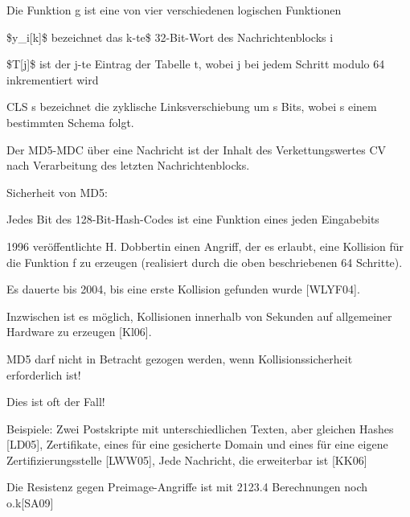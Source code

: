 \documentclass[a4paper]{article}
\begin{document}
\begin{multicols}{3}
\begin{itemize*}
            \begin{itemize*}
                  \item Die Funktion g ist eine von vier verschiedenen logischen Funktionen
                  \item \$y\_i{[}k{]}\$ bezeichnet das k-te\$ 32-Bit-Wort des Nachrichtenblocks i
                  \item \$T{[}j{]}\$ ist der j-te Eintrag der Tabelle t, wobei j bei jedem Schritt modulo 64 inkrementiert wird
                  \item CLS s bezeichnet die zyklische Linksverschiebung um s Bits, wobei s einem bestimmten Schema folgt.
            \end{itemize*}
            \item
            Der MD5-MDC über eine Nachricht ist der Inhalt des Verkettungswertes
            CV nach Verarbeitung des letzten Nachrichtenblocks.
            \item
            Sicherheit von MD5:

            \begin{itemize*}
                  \item Jedes Bit des 128-Bit-Hash-Codes ist eine Funktion eines jeden Eingabebits
                  \item 1996 veröffentlichte H. Dobbertin einen Angriff, der es erlaubt, eine Kollision für die Funktion f zu erzeugen (realisiert durch die oben beschriebenen 64 Schritte).
                  \item Es dauerte bis 2004, bis eine erste Kollision gefunden wurde {[}WLYF04{]}.
                  \item Inzwischen ist es möglich, Kollisionen innerhalb von Sekunden auf allgemeiner Hardware zu erzeugen {[}Kl06{]}.
                  \item MD5 darf nicht in Betracht gezogen werden, wenn Kollisionssicherheit erforderlich ist!
                  \begin{itemize*} \item Dies ist oft der Fall! \item Beispiele: Zwei Postskripte mit unterschiedlichen Texten, aber gleichen Hashes {[}LD05{]}, Zertifikate, eines für eine gesicherte Domain und eines für eine eigene Zertifizierungsstelle {[}LWW05{]}, Jede Nachricht, die erweiterbar ist {[}KK06{]} \end{itemize*}
                  \item Die Resistenz gegen Preimage-Angriffe ist mit 2123.4 Berechnungen noch o.k{[}SA09{]}
            \end{itemize*}
      \end{itemize*}



\end{multicols}
\end{document}
